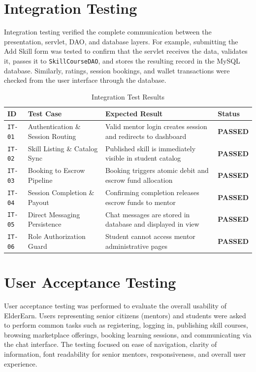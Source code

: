 \section{Integration Testing}
Integration testing verified the complete communication between the presentation, servlet, DAO, and database layers. For example, submitting the Add Skill form was tested to confirm that the servlet receives the data, validates it, passes it to \texttt{SkillCourseDAO}, and stores the resulting record in the MySQL database. Similarly, ratings, session bookings, and wallet transactions were checked from the user interface through the database.

\begin{table}[H]
\centering
\small
\caption{Integration Test Results}
\label{tab:integration_test_results}
\begin{tabularx}{\textwidth}{|L{1.8cm}|L{4.2cm}|J|C{2.0cm}|}
\hline
\textbf{ID} & \textbf{Test Case} & \textbf{Expected Result} & \textbf{Status} \\ \hline
\texttt{IT-01} & Authentication \& Session Routing & Valid mentor login creates session and redirects to dashboard & \textbf{PASSED} \\ \hline
\texttt{IT-02} & Skill Listing \& Catalog Sync & Published skill is immediately visible in student catalog & \textbf{PASSED} \\ \hline
\texttt{IT-03} & Booking to Escrow Pipeline & Booking triggers atomic debit and escrow fund allocation & \textbf{PASSED} \\ \hline
\texttt{IT-04} & Session Completion \& Payout & Confirming completion releases escrow funds to mentor & \textbf{PASSED} \\ \hline
\texttt{IT-05} & Direct Messaging Persistence & Chat messages are stored in database and displayed in view & \textbf{PASSED} \\ \hline
\texttt{IT-06} & Role Authorization Guard & Student cannot access mentor administrative pages & \textbf{PASSED} \\ \hline
\end{tabularx}
\end{table}

\section{User Acceptance Testing}
User acceptance testing was performed to evaluate the overall usability of ElderEarn. Users representing senior citizens (mentors) and students were asked to perform common tasks such as registering, logging in, publishing skill courses, browsing marketplace offerings, booking learning sessions, and communicating via the chat interface. The testing focused on ease of navigation, clarity of information, font readability for senior mentors, responsiveness, and overall user experience.

